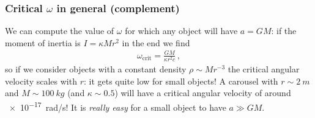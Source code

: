 \documentclass[main.tex]{subfiles}
\begin{document}
\subsubsection{Critical \(\omega \) in general (complement)}

We can compute the value of \(\omega \) for which any object will have \(a = GM\): if the moment of inertia is \(I = \kappa M r^2\) in the end we find 
%
\begin{align}
  \omega _{\text{crit}} = \frac{GM}{\kappa r^2 c}
\,,
\end{align}
%
so if we consider objects with a constant density \(\rho \sim M r^{-3}\) the critical angular velocity scales with \(r\): it gets quite low for small objects! 
A carousel with \(r \sim \SI{2}{m}\) and \(M \sim \SI{100}{kg}\) (and \(\kappa \sim 0.5\)) will have a critical angular velocity of around \SI{e-17}{rad/s}! It is \emph{really easy} for a small object to have \(a \gg GM\). 
\end{document}
